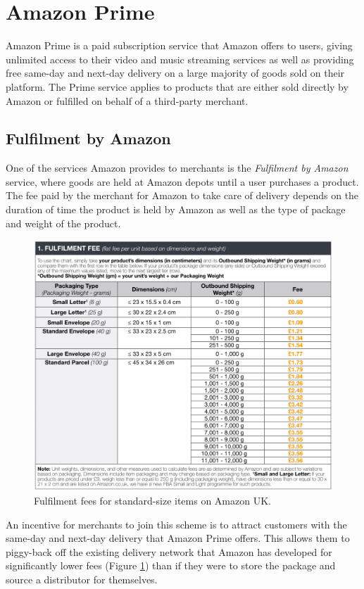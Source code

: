 \documentclass[a4paper,11pt,titlepage]{report}
\begin{document}
\section{Amazon Prime}
Amazon Prime is a paid subscription service that Amazon offers to users, giving unlimited access to their video and music streaming services as well as providing free same-day and next-day delivery on a large majority of goods sold on their platform. The Prime service applies to products that are either sold directly by Amazon or fulfilled on behalf of a third-party merchant.

\subsection{Fulfilment by Amazon}
One of the services Amazon provides to merchants is the \textit{Fulfilment by Amazon} service, where goods are held at Amazon depots until a user purchases a product. The fee paid by the merchant for Amazon to take care of delivery depends on the duration of time the product is held by Amazon as well as the type of package and weight of the product.

\begin{figure}[!hbpt]
  \center
  \includegraphics[width=0.9\linewidth]{img/fulfilled_by_amazon_table.png}
  \caption{Fulfilment fees for standard-size items on Amazon UK. \cite{Channel2017}}
  \label{fig:fulfilled_by_amazon_table}
\end{figure}

\newpage
An incentive for merchants to join this scheme is to attract customers with the same-day and next-day delivery that Amazon Prime offers. This allows them to piggy-back off the existing delivery network that Amazon has developed for significantly lower fees (Figure \ref{fig:fulfilled_by_amazon_table}) than if they were to store the package and source a distributor for themselves.
\end{document}
